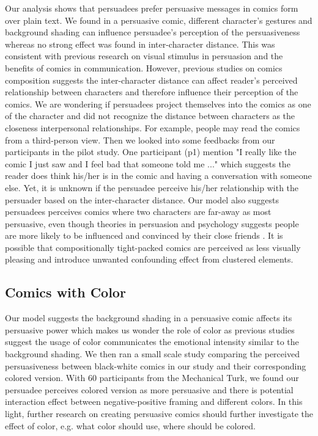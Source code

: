 Our analysis shows that persuadees prefer persuasive messages in comics form over plain text. We found in a persuasive comic, different character's gestures and background shading can influence persuadee's perception of the persuasiveness whereas no strong effect was found in inter-character distance. This was consistent with previous research on visual stimulus in persuasion and the benefits of comics in communication. However, previous studies on comics composition suggests the inter-character distance can affect reader's perceived relationship between characters and therefore influence their perception of the comics. We are wondering if persuadees project themselves into the comics as one of the character and did not recognize the distance between characters as the closeness interpersonal relationships. For example, people may read the comics from a third-person view. Then we looked into some feedbacks from our participants in the pilot study. One participant (p1) mention "I really like the comic I just saw and I feel bad that someone told me ..." which suggests the reader does think his/her is in the comic and having a conversation with someone else. Yet, it is unknown if the persuadee perceive his/her relationship with the persuader based on the inter-character distance. Our model also suggests persuadees perceives comics where two characters are far-away as most persuasive, even though theories in persuasion and psychology suggests people are more likely to be influenced and convinced by their close friends \cite{daddis2008influence,merga2014peer,shin2013user}. It is possible that compositionally tight-packed comics are perceived as less visually pleasing and introduce unwanted confounding effect from clustered elements.

\subsection{Comics with Color}
Our model suggests the background shading in a persuasive comic affects its persuasive power which makes us wonder the role of color as previous studies suggest the usage of color communicates the emotional intensity similar to the background shading. We then ran a small scale study comparing the perceived persuasiveness between black-white comics in our study and their corresponding colored version. With 60 participants from the Mechanical Turk,  we found our persuadee perceives colored version as more persuasive and there is potential interaction effect between negative-positive framing and different colors. In this light, further research on creating persuasive comics should further investigate the effect of color, e.g. what color should use, where should be colored.

